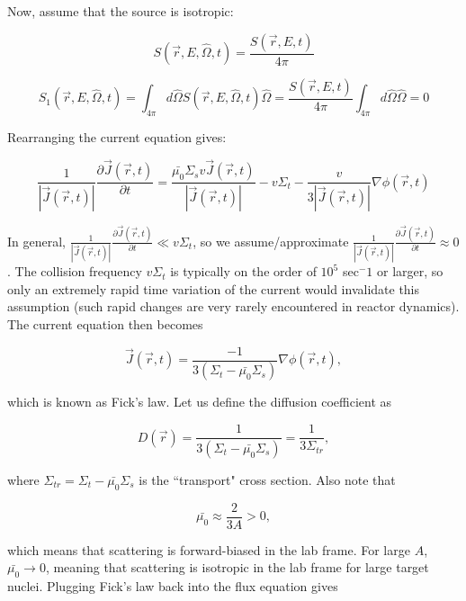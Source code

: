 \documentclass[12pt]{article}
\newcommand{\rvec}{\ensuremath{\vec{r}}}
\newcommand{\omvec}{\ensuremath{\hat{\Omega}}}
\begin{document}
Now, assume that the source is isotropic:

\begin{equation*}
S(\rvec,E,\omvec,t) = \frac{S(\rvec,E,t)}{4\pi}
\end{equation*}

\begin{equation*}
S_1(\rvec,E,\omvec,t) = \int_{4\pi}d\omvec S(\rvec,E,\omvec,t)\omvec 
= \frac{S(\rvec,E,t)}{4\pi} \int_{4\pi}d\omvec\omvec = 0
\end{equation*}

Rearranging the current equation gives:

\begin{equation*}
\frac{1}{|\vec{J}(\rvec,t)|}\frac{\partial\vec{J}(\rvec,t)}{\partial t} 
= \frac{\bar{\mu_0}\Sigma_sv\vec{J}(\rvec,t)}{|\vec{J}(\rvec,t)|} - v\Sigma_t 
- \frac{v}{3|\vec{J}(\rvec,t)|}\nabla\phi(\rvec,t)
\end{equation*}

In general, $\frac{1}{|\vec{J}(\rvec,t)|}\frac{\partial\vec{J}(\rvec,t)}{\partial t} \ll v\Sigma_t$, so we
assume/approximate $\frac{1}{|\vec{J}(\rvec,t)|}\frac{\partial\vec{J}(\rvec,t)}{\partial t}\approx 0$. The
collision frequency $v\Sigma_t$ is typically on the order of $10^5$ sec${^-1}$ or larger, so only an
extremely rapid time variation of the current would invalidate this assumption (such rapid changes are
very rarely encountered in reactor dynamics). The current equation then becomes

\begin{equation*}
\vec{J}(\rvec,t) = \frac{-1}{3(\Sigma_t - \bar{\mu_0}\Sigma_s)}\nabla\phi(\rvec,t),
\end{equation*}

which is known as Fick's law. Let us define the diffusion coefficient as

\begin{equation*}
D(\rvec) = \frac{1}{3(\Sigma_t - \bar{\mu_0}\Sigma_s)} = \frac{1}{3\Sigma_{tr}},
\end{equation*}

where $\Sigma_{tr} = \Sigma_t - \bar{\mu_0}\Sigma_s$ is the ``transport" cross section. Also note that

\begin{equation*}
\bar{\mu_0} \approx \frac{2}{3A} > 0,
\end{equation*}

which means that scattering is forward-biased in the lab frame. For large $A$, $\bar{\mu_0}\rightarrow0$,
meaning that scattering is isotropic in the lab frame for large target nuclei. Plugging Fick's law back 
into the flux equation gives
\end{document}
